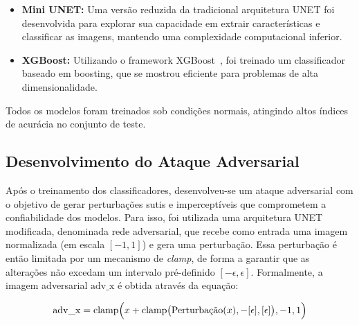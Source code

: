 \documentclass[12pt]{article}
\begin{document}
\begin{itemize}
  \item \textbf{Mini UNET:} Uma versão reduzida da tradicional arquitetura UNET foi desenvolvida para explorar sua capacidade em extrair características e classificar as imagens, mantendo uma complexidade computacional inferior.

  \item \textbf{XGBoost:} Utilizando o framework XGBoost~\cite{Chen_2016}, foi treinado um classificador baseado em boosting, que se mostrou eficiente para problemas de alta dimensionalidade.
\end{itemize}

Todos os modelos foram treinados sob condições normais, atingindo altos índices
de acurácia no conjunto de teste.

\subsection{Desenvolvimento do Ataque Adversarial}

Após o treinamento dos classificadores, desenvolveu-se um ataque adversarial
com o objetivo de gerar perturbações sutis e imperceptíveis que comprometem a
confiabilidade dos modelos. Para isso, foi utilizada uma arquitetura UNET
modificada, denominada rede adversarial, que recebe como entrada uma imagem
normalizada (em escala \([-1, 1]\)) e gera uma perturbação. Essa perturbação é
então limitada por um mecanismo de \textit{clamp}, de forma a garantir que as
alterações não excedam um intervalo pré-definido \([-\epsilon, \epsilon]\).
Formalmente, a imagem adversarial \( \text{adv\_x} \) é obtida através da
equação:

\[
  \text{adv\_x} = \text{clamp}\Bigl(x + \text{clamp}\bigl(\text{Perturbação}(x), -[\epsilon], [\epsilon]\bigr), -1, 1\Bigr)
\]
\end{document}
